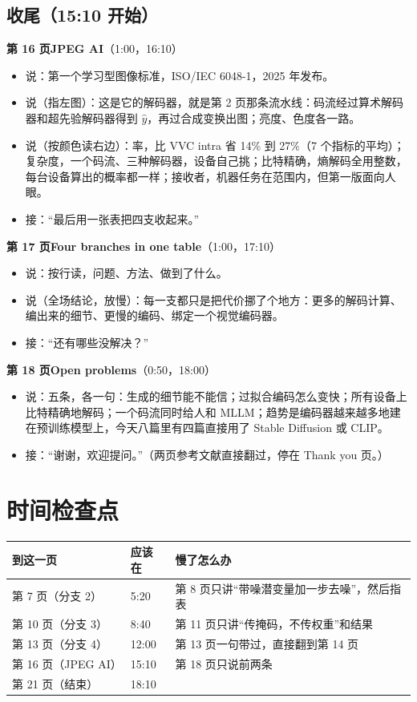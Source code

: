 \subsection*{收尾（15:10 开始）}

\textbf{第 16 页\quad JPEG AI}（1:00，16:10）
\begin{itemize}
  \item 说：第一个学习型图像标准，ISO/IEC 6048-1，2025 年发布。
  \item 说（指左图）：这是它的解码器，就是第 2 页那条流水线：码流经过算术解码器和超先验解码器得到 $\hat y$，再过合成变换出图；亮度、色度各一路。
  \item 说（按颜色读右边）：\textcolor{sig}{率}，比 VVC intra 省 14\% 到 27\%（7 个指标的平均）；\textcolor{video}{复杂度}，一个码流、三种解码器，设备自己挑；比特精确，熵解码全用整数，每台设备算出的概率都一样；\textcolor{hot}{接收者}，机器任务在范围内，但第一版面向人眼。
  \item 接：“最后用一张表把四支收起来。”
\end{itemize}

\textbf{第 17 页\quad Four branches in one table}（1:00，17:10）
\begin{itemize}
  \item 说：按行读，问题、方法、做到了什么。
  \item 说（全场结论，放慢）：每一支都只是把代价挪了个地方：更多的解码计算、编出来的细节、更慢的编码、绑定一个视觉编码器。
  \item 接：“还有哪些没解决？”
\end{itemize}

\textbf{第 18 页\quad Open problems}（0:50，18:00）
\begin{itemize}
  \item 说：五条，各一句：生成的细节能不能信；过拟合编码怎么变快；所有设备上比特精确地解码；一个码流同时给人和 MLLM；趋势是编码器越来越多地建在预训练模型上，今天八篇里有四篇直接用了 Stable Diffusion 或 CLIP。
  \item 接：“谢谢，欢迎提问。”（两页参考文献直接翻过，停在 Thank you 页。）
\end{itemize}

\section{时间检查点}

\begin{center}
\begin{tabular}{lll}
\toprule
到这一页 & 应该在 & 慢了怎么办 \\
\midrule
第 7 页（分支 2） & 5:20 & 第 8 页只讲“带噪潜变量加一步去噪”，然后指表 \\
第 10 页（分支 3） & 8:40 & 第 11 页只讲“传掩码，不传权重”和结果 \\
第 13 页（分支 4） & 12:00 & 第 13 页一句带过，直接翻到第 14 页 \\
第 16 页（JPEG AI） & 15:10 & 第 18 页只说前两条 \\
第 21 页（结束） & 18:10 & \\
\bottomrule
\end{tabular}
\end{center}

